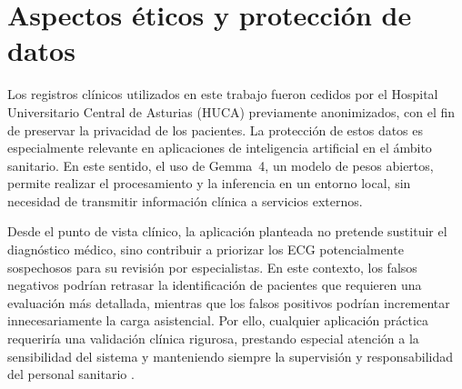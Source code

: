 \section{Aspectos éticos y protección de datos}
\label{chap:gestion_etica}

Los registros clínicos utilizados en este trabajo fueron cedidos por el Hospital Universitario Central de Asturias (HUCA) previamente anonimizados, con el fin de preservar la privacidad de los pacientes. La protección de estos datos es especialmente relevante en aplicaciones de inteligencia artificial en el ámbito sanitario. En este sentido, el uso de Gemma~4, un modelo de pesos abiertos, permite realizar el procesamiento y la inferencia en un entorno local, sin necesidad de transmitir información clínica a servicios externos.

Desde el punto de vista clínico, la aplicación planteada no pretende sustituir el diagnóstico médico, sino contribuir a priorizar los ECG potencialmente sospechosos para su revisión por especialistas. En este contexto, los falsos negativos podrían retrasar la identificación de pacientes que requieren una evaluación más detallada, mientras que los falsos positivos podrían incrementar innecesariamente la carga asistencial. Por ello, cualquier aplicación práctica requeriría una validación clínica rigurosa, prestando especial atención a la sensibilidad del sistema y manteniendo siempre la supervisión y responsabilidad del personal sanitario \cite{zeppenfeld2022,wilde2023scbt}.
